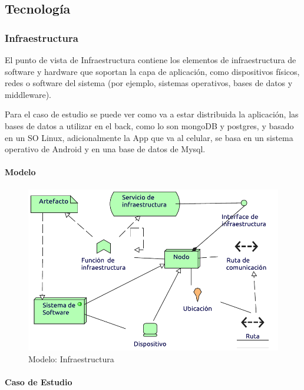 \subsection{Tecnología}

\subsubsection{Infraestructura}
El punto de vista de Infraestructura contiene los elementos de infraestructura de software y hardware que soportan la capa de aplicación, como dispositivos físicos, redes o software del sistema (por ejemplo, sistemas operativos, bases de datos y middleware).  \vspace{\baselineskip}

Para el caso de estudio se puede ver como va a estar distribuida la aplicación, las bases de datos a utilizar en el back, como lo son mongoDB y postgres, y basado en un SO Linux, adicionalmente la App que va al celular, se basa en un sistema operativo de Android y en una base de datos de Mysql.

\paragraph{Modelo}
\begin{figure}[h!]
	\centering
	\includegraphics[width=0.8\linewidth]{Desarrollo/ArquitecturaEmpresarial/Tecnologia/imgs/insfraestructuraMetamodelo.pdf}
	\caption{Modelo: Infraestructura}
\end{figure}
\newpage
\paragraph{Caso de Estudio}


